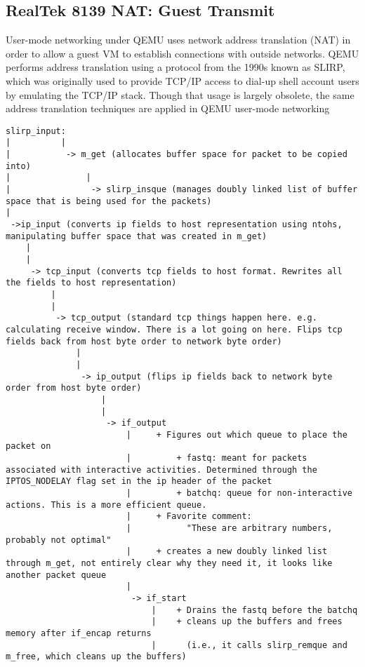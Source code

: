 \documentclass[11pt,pdftex,twocolumn]{article}
\begin{document}
\subsection{RealTek 8139 NAT: Guest Transmit}
User-mode networking under QEMU uses network address translation (NAT) in order to allow a guest VM to establish connections with outside networks. QEMU performs address translation using a protocol from the 1990s known as SLIRP, which was originally used to provide TCP/IP access to dial-up shell account users by emulating the TCP/IP stack. Though that usage is largely obsolete, the same address translation techniques are applied in QEMU user-mode networking 

\begin{verbatim}
slirp_input:
|          |
|           -> m_get (allocates buffer space for packet to be copied into)
|               |
|                -> slirp_insque (manages doubly linked list of buffer space that is being used for the packets)
|
 ->ip_input (converts ip fields to host representation using ntohs, manipulating buffer space that was created in m_get)
    |
    |
     -> tcp_input (converts tcp fields to host format. Rewrites all the fields to host representation)
         |
         |
          -> tcp_output (standard tcp things happen here. e.g. calculating receive window. There is a lot going on here. Flips tcp fields back from host byte order to network byte order)
              |
              |
               -> ip_output (flips ip fields back to network byte order from host byte order)
                   |
                   |
                    -> if_output 
                        |     + Figures out which queue to place the packet on
                        |         + fastq: meant for packets associated with interactive activities. Determined through the IPTOS_NODELAY flag set in the ip header of the packet
                        |         + batchq: queue for non-interactive actions. This is a more efficient queue.
                        |     + Favorite comment:
                        |           "These are arbitrary numbers, probably not optimal"
                        |     + creates a new doubly linked list through m_get, not entirely clear why they need it, it looks like another packet queue
                        |
                         -> if_start
                             |    + Drains the fastq before the batchq
                             |    + cleans up the buffers and frees memory after if_encap returns
                             |      (i.e., it calls slirp_remque and m_free, which cleans up the buffers)

\end{verbatim}
\end{document}
